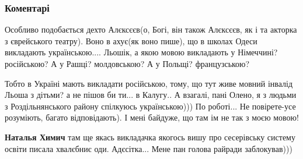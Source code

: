  
 
 
 
 
\subsubsection{Коментарі}

\begin{itemize}
 

Особливо подобається дехто Алєксєєв(о, Богі, він також Алєксєєв, як і та акторка з
єврейського театру). Воно в ахує(як воно пише), що в школах Одеси викладають
українською.... Льошік, а якою мовою викладають у Німеччині? російською? А у
Рашці? молдовською? А у Польщі? французською?

Тобто в Україні мають викладати російською, тому, що тут живе мовний інвалід
Льоша з дітьми? а не пішов би ти... в Калугу.. А взагалі, пані Олено, я з людьми з
Роздільнянського району спілкуюсь українською))) По роботі... Не повірете-усе
розуміють, багато відповідають). І мені байдуже, що там ім не так з моєю мовою!

\begin{itemize}
 
\textbf{Наталья Химич} там ще якась викладачка якогось вишу про сесерівську систему освіти писала хвалєбниє оди. Адєсітка...
Мене пан голова райради заблокував)))
\end{itemize}

 

\end{itemize}
